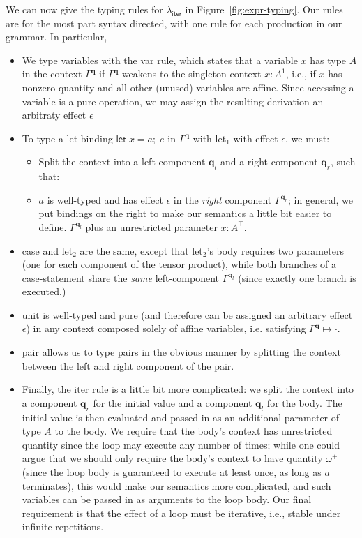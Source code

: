 \documentclass[acmsmall,screen,review]{acmart}
\newcommand{\mb}[1]{\ensuremath{\mathbf{#1}}}
\newcommand{\ms}[1]{\ensuremath{\mathsf{#1}}}
\newcommand{\letexpr}[3]{\ensuremath{\ms{let}\;#1 = #2;\;#3}}
\newcommand{\cwk}[2]{#1 \mapsto #2}
\newcommand{\brle}[1]{{\textsf{#1}}}
\newcommand{\subiterexp}{\(\lambda_{\ms{iter}}\)}
\newcommand{\oneq}{1}
\newcommand{\cpyq}{\omega^+}
\begin{document}
We can now give the typing rules for \subiterexp{} in Figure~\ref{fig:expr-typing}. Our rules
are for the most part syntax directed, with one rule for each production in our grammar. In
particular,
\begin{itemize}
  \item We type variables with the \brle{var} rule, which states that a variable $x$ has type $A$ in
  the context $\Gamma^{\mb{q}}$ if $\Gamma^{\mb{q}}$ weakens to the singleton context $x: A^\oneq$,
  i.e., if $x$ has nonzero quantity and all other (unused) variables are affine. Since accessing a
  variable is a pure operation, we may assign the resulting derivation an arbitraty effect
  $\epsilon$
  \item To type a let-binding $\letexpr{x}{a}{e}$ in $\Gamma^{\mb{q}}$ with \brle{let$_1$} with
  effect $\epsilon$, we must:
  \begin{itemize}
    \item Split the context into a left-component $\mb{q}_l$ and a right-component
    $\mb{q}_r$, such that:
    \item $a$ is well-typed and has effect $\epsilon$ in the \emph{right} component
    $\Gamma^{\mb{q}_r}$; in general, we put bindings on the right to make our semantics a little bit
    easier to define. $\Gamma^{\mb{q}_l}$ plus an unrestricted parameter $x: A^\top$.
  \end{itemize}
  \item \brle{case} and \brle{let$_2$} are the same, except that \brle{let$_2$}'s body requires two
  parameters (one for each component of the tensor product), while both branches of a case-statement
  share the \emph{same} left-component $\Gamma^{\mb{q}_l}$ (since exactly one branch is executed.)
  \item \brle{unit} is well-typed and pure (and therefore can be assigned an arbitrary effect
  $\epsilon$) in any context composed solely of affine variables, i.e. satisfying
  $\cwk{\Gamma^{\mb{q}}}{\cdot}$.
  \item \brle{pair} allows us to type pairs in the obvious manner by splitting the context between
  the left and right component of the pair.
  \item Finally, the \brle{iter} rule is a little bit more complicated: we split the context into a
  component $\mb{q}_r$ for the initial value and a component $\mb{q}_l$ for the body. The initial
  value is then evaluated and passed in as an additional parameter of type $A$ to the body. We
  require that the body's context has unrestricted quantity since the loop may execute any number of
  times; while one could argue that we should only require the body's context to have quantity
  $\cpyq$ (since the loop body is guaranteed to execute at least once, as long as $a$ terminates),
  this would make our semantics more complicated, and such variables can be passed in as arguments
  to the loop body. Our final requirement is that the effect of a loop must be iterative, i.e.,
  stable under infinite repetitions.
\end{itemize}
\end{document}
